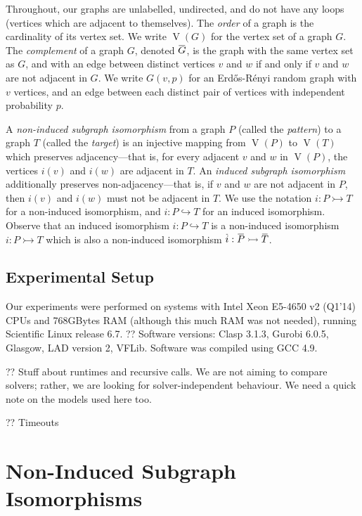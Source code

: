 \documentclass[letterpaper]{article}
\newcommand{\shortoverline}[1]{\mkern 1.5mu\overline{\mkern-1.5mu#1\mkern-1.5mu}\mkern 1.5mu}
\begin{document}
Throughout, our graphs are unlabelled, undirected, and do not have any loops (vertices which are
adjacent to themselves).  The \emph{order} of a graph is the cardinality of its vertex set. We write
$\operatorname{V}(G)$ for the vertex set of a graph $G$. The \emph{complement} of a graph $G$,
denoted $\shortoverline{G}$, is the
graph with the same vertex set as $G$, and with an edge between distinct vertices $v$ and $w$ if and
only if
$v$ and $w$ are not adjacent in $G$. We write $G(v, p)$ for an Erd\H{o}s-R\'enyi random graph with
$v$ vertices, and an edge between each distinct pair of vertices with independent probability $p$.

A \emph{non-induced subgraph isomorphism} from a graph $P$ (called the \emph{pattern}) to a graph
$T$ (called the \emph{target}) is an injective mapping from $\operatorname{V}(P)$ to
$\operatorname{V}(T)$ which preserves adjacency---that is, for every adjacent $v$ and $w$ in
$\operatorname{V}(P)$, the vertices $i(v)$ and $i(w)$ are adjacent in $T$. An \emph{induced subgraph
isomorphism} additionally preserves non-adjacency---that is, if $v$ and $w$ are not adjacent in $P$,
then $i(v)$ and $i(w)$ must not be adjacent in $T$. We use the notation $i : P \rightarrowtail T$
for a non-induced isomorphism, and $i : P \hookrightarrow T$ for an induced isomorphism. Observe
that an induced isomorphism $i : P \hookrightarrow T$ is a non-induced isomorphism $i : P
\rightarrowtail T$ which is also a non-induced isomorphism $\shortoverline{i} : \shortoverline{P}
\rightarrowtail \shortoverline{T}$.

\subsection{Experimental Setup}

Our experiments were performed on systems with Intel Xeon E5-4650 v2 (Q1'14) CPUs and 768GBytes RAM
(although this much RAM was not needed), running Scientific Linux release 6.7.   ?? Software
versions: Clasp 3.1.3, Gurobi 6.0.5, Glasgow, LAD version 2, VFLib. Software was compiled using GCC
4.9.

?? Stuff about runtimes and recursive calls. We are not aiming to compare solvers; rather, we are
looking for solver-independent behaviour. We need a quick note on the models used here too.

?? Timeouts

\section{Non-Induced Subgraph Isomorphisms}
\end{document}
